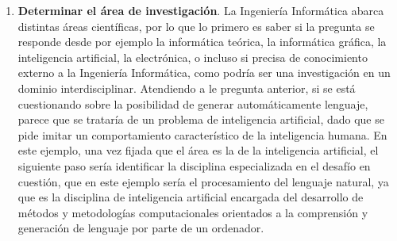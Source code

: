 \begin{enumerate}
    \item \textbf{Determinar el área de investigación}. La Ingeniería Informática abarca distintas áreas científicas, por lo que lo primero es saber si la pregunta se responde desde por ejemplo la informática teórica, la informática gráfica, la inteligencia artificial, la electrónica, o incluso si precisa de conocimiento externo a la Ingeniería Informática, como podría ser una investigación en un dominio interdisciplinar. Atendiendo a le pregunta anterior, si se está cuestionando sobre la posibilidad de generar automáticamente lenguaje, parece que se trataría de un problema de inteligencia artificial, dado que se pide imitar un comportamiento característico de la inteligencia humana. En este ejemplo, una vez fijada que el área es la de la inteligencia artificial, el siguiente paso sería identificar la disciplina especializada en el desafío en cuestión, que en este ejemplo sería el procesamiento del lenguaje natural, ya que es la disciplina de inteligencia artificial encargada del desarrollo de métodos y metodologías computacionales orientados a la comprensión y generación de lenguaje por parte de un ordenador.


\end{enumerate}
